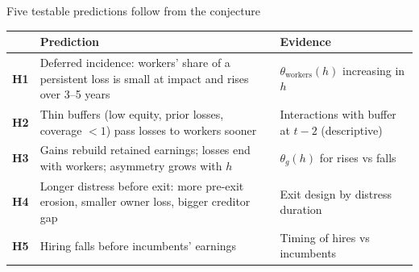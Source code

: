 \documentclass[aspectratio=169,11pt]{beamer}
\newlength{\safezone}
\newcommand{\hy}[1]{\textbf{\textcolor{SlateTeal}{#1}}}
\begin{document}
\begin{frame}[label=hyp]{Five testable predictions follow from the conjecture}
  \small
  \renewcommand{\arraystretch}{1.2}
  \begin{tabularx}{\textwidth}{p{0.8cm} >{\raggedright\arraybackslash}X >{\raggedright\arraybackslash}p{3.6cm}}
    \toprule
     & \textbf{Prediction} & \textbf{Evidence} \\
    \midrule
    \hy{H1} & Deferred incidence: workers' share of a persistent loss is small at impact and rises over 3--5 years & $\theta_{\text{workers}}(h)$ increasing in $h$ \\
    \hy{H2} & Thin buffers (low equity, prior losses, coverage $<1$) pass losses to workers sooner & Interactions with buffer at $t-2$ (descriptive) \\
    \hy{H3} & Gains rebuild retained earnings; losses end with workers; asymmetry grows with $h$ & $\theta_g(h)$ for rises vs falls \\
    \hy{H4} & Longer distress before exit: more pre-exit erosion, smaller owner loss, bigger creditor gap & Exit design by distress duration \\
    \hy{H5} & Hiring falls before incumbents' earnings & Timing of hires vs incumbents \\
    \bottomrule
  \end{tabularx}
  \vfill
  \hfill \hyperlink{conjecture}{}\hspace{\safezone}
\end{frame}
\end{document}
